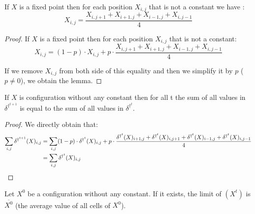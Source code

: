 \begin{lemma}
 \label{aver}
 If $X$ is a fixed point then for each position $X_{i,j}$ that is not a constant we have : 
\[ X_{i,j} = \frac{X_{i,j+1} + X_{i+1,j} + X_{i-1,j} + X_{i,j-1}}{4} \]
\end{lemma}

\begin{proof}
  If $X$ is a fixed point then for each position $X_{i,j}$ that is not a constant:
  \[ X_{i,j} = (1-p) \cdot X_{i,j} + p \cdot \frac{X_{i,j+1} + X_{i+1,j} + X_{i-1,j} + X_{i,j-1}}{4} \]
  
  If we remove $X_{i,j}$ from both side of this equality and then we simplify it by $p$ ($p \neq 0$), we obtain the lemma.
\end{proof}


\begin{lemma}
  \label{conservative}
  If $X$ is configuration without any constant then for all t the sum of all values in $\delta^{\dag^{t+1}}$ is equal to the sum of all values in $\delta^{\dag^t}$.
\end{lemma}

\begin{proof}
  We directly obtain that:
  \[\begin{split}
    \sum_{i,j} \delta^{\dag^{t+1}}(X)_{i,j} & = \sum_{i,j} (1-p) \cdot \delta^{\dag^t}(X)_{i,j} + p \cdot \frac{\delta^{\dag^t}(X)_{i+1,j} + \delta^{\dag^t}(X)_{i,j+1} + \delta^{\dag^t}(X)_{i-1,j} + \delta^{\dag^t}(X)_{i,j-1}}{4} \\
        & = \sum_{i,j} \delta^{\dag^t}(X)_{i,j}
  \end{split} \]
\end{proof}

\begin{prop}
  \label{limnoc}
  Let $X^0$ be a configuration without any constant. If it exists, the limit of $(X^t)$ is $\overline{X^0}$ (the average value of all cells of $X^0$).
\end{prop}

